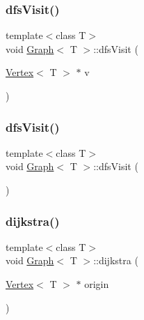 \subsubsection{\texorpdfstring{dfs\+Visit()}{dfsVisit()}\hspace{0.1cm}{\footnotesize\ttfamily [1/2]}}
{\footnotesize\ttfamily template$<$class T$>$ \\
void \hyperlink{class_graph}{Graph}$<$ T $>$\+::dfs\+Visit (\begin{DoxyParamCaption}\item[{\hyperlink{class_vertex}{Vertex}$<$ T $>$ $\ast$}]{v }\end{DoxyParamCaption})\hspace{0.3cm}{\ttfamily [private]}}

\mbox{\label{class_graph_a4d5abd78dd24ea71dbf50e1b0284d4b3}} 
\subsubsection{\texorpdfstring{dfs\+Visit()}{dfsVisit()}\hspace{0.1cm}{\footnotesize\ttfamily [2/2]}}
{\footnotesize\ttfamily template$<$class T$>$ \\
void \hyperlink{class_graph}{Graph}$<$ T $>$\+::dfs\+Visit (\begin{DoxyParamCaption}{ }\end{DoxyParamCaption})\hspace{0.3cm}{\ttfamily [private]}}

\mbox{\label{class_graph_ad0319019c0883094c0d09841e88f2179}} 
\subsubsection{\texorpdfstring{dijkstra()}{dijkstra()}}
{\footnotesize\ttfamily template$<$class T$>$ \\
void \hyperlink{class_graph}{Graph}$<$ T $>$\+::dijkstra (\begin{DoxyParamCaption}\item[{\hyperlink{class_vertex}{Vertex}$<$ T $>$ $\ast$}]{origin }\end{DoxyParamCaption})}

